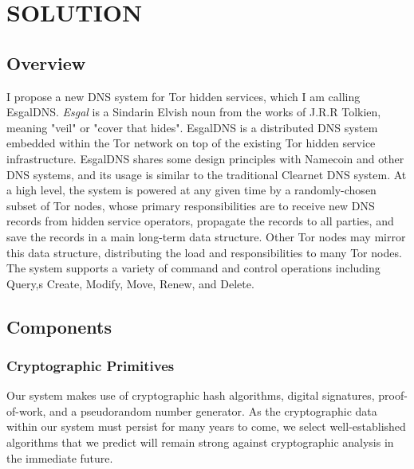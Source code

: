 \chapter{\uppercase{Solution}}

\section{Overview}

I propose a new DNS system for Tor hidden services, which I am calling EsgalDNS. \emph{Esgal} is a Sindarin Elvish noun from the works of J.R.R Tolkien, meaning "veil" or "cover that hides".\cite{SindarinDict} EsgalDNS is a distributed DNS system embedded within the Tor network on top of the existing Tor hidden service infrastructure. EsgalDNS shares some design principles with Namecoin and other DNS systems, and its usage is similar to the traditional Clearnet DNS system. At a high level, the system is powered at any given time by a randomly-chosen subset of Tor nodes, whose primary responsibilities are to receive new DNS records from hidden service operators, propagate the records to all parties, and save the records in a main long-term data structure. Other Tor nodes may mirror this data structure, distributing the load and responsibilities to many Tor nodes. The system supports a variety of command and control operations including Query,s Create, Modify, Move, Renew, and Delete. 

\section{Components}

\subsection{Cryptographic Primitives}

Our system makes use of cryptographic hash algorithms, digital signatures, proof-of-work, and a pseudorandom number generator. As the cryptographic data within our system must persist for many years to come, we select well-established algorithms that we predict will remain strong against cryptographic analysis in the immediate future.

